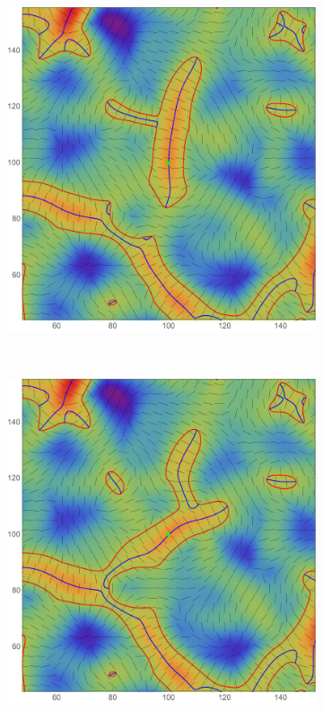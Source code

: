 \documentclass[a4paper, 11pt]{article}
\begin{document}
\begin{figure}
\centering
\begin{subfigure}[b]{0.32\textwidth}
\includegraphics[width=\textwidth]{Rotation_L_1}
\end{subfigure}~
\begin{subfigure}[b]{0.32\textwidth}
\includegraphics[width=\textwidth]{Rotation_L_2}

\end{subfigure}
\end{figure}
\end{document}
